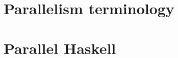 \documentclass[CS4204-Notes.tex]{subfiles}
\begin{document}
\section{Parallelism terminology}


\section{Parallel Haskell}
\end{document}
